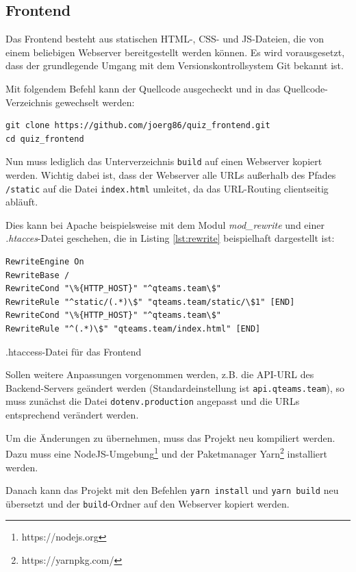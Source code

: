 \documentclass[a4paper,11pt,listof=numbered,glossary=totoc,parskip=half,toc=bib]{scrreprt}
\begin{document}
\begin{appendices}
	\section{Frontend}
	
	Das Frontend besteht aus statischen HTML-, CSS- und JS-Dateien, die von einem beliebigen Webserver bereitgestellt werden können.
	Es wird vorausgesetzt, dass der grundlegende Umgang mit dem Versionskontrollsystem Git bekannt ist.
	
	Mit folgendem Befehl kann der Quellcode ausgecheckt und in das Quellcode-Verzeichnis gewechselt werden:		
	\begin{verbatim}
git clone https://github.com/joerg86/quiz_frontend.git
cd quiz_frontend
	\end{verbatim}
	
	Nun muss lediglich das Unterverzeichnis \texttt{build} auf einen Webserver kopiert werden. Wichtig dabei ist, dass der Webserver alle URLs außerhalb des Pfades \texttt{/static} auf die Datei \texttt{index.html} umleitet, da das URL-Routing clientseitig abläuft.
	
	Dies kann bei Apache beispielsweise mit dem Modul \textit{mod\_{}rewrite} und einer \textit{.htacces}-Datei geschehen, die in Listing \ref{lst:rewrite} beispielhaft dargestellt ist:
	\begin{listing}
	\begin{verbatim}
RewriteEngine On
RewriteBase /
RewriteCond "\%{HTTP_HOST}" "^qteams.team\$" 
RewriteRule "^static/(.*)\$" "qteams.team/static/\$1" [END]
RewriteCond "\%{HTTP_HOST}" "^qteams.team\$" 
RewriteRule "^(.*)\$" "qteams.team/index.html" [END]
	\end{verbatim}
		\caption{.htaccess-Datei für das Frontend}
		\label{lst:rewrite}
	\end{listing}
	
	Sollen weitere Anpassungen vorgenommen werden, z.B. die API-URL des Backend-Servers geändert werden (Standardeinstellung ist \texttt{api.qteams.team}), so muss zunächst die Datei \texttt{dotenv.production} angepasst und die URLs entsprechend verändert werden.
	
	Um die Änderungen zu übernehmen, muss das Projekt neu kompiliert werden. Dazu muss eine NodeJS-Umgebung\footnote{https://nodejs.org} und der Paketmanager Yarn\footnote{https://yarnpkg.com/} installiert werden.
	
	Danach kann das Projekt mit den Befehlen \texttt{yarn install} und \texttt{yarn build} neu übersetzt und der \texttt{build}-Ordner auf den Webserver kopiert werden.
	

\end{appendices}
\end{document}
